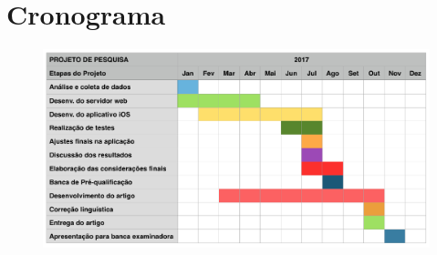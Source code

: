 \documentclass[
	12pt,
	oneside,
	a4paper,
	english,
	brazil,
]{abntex2}
\begin{document}

\chapter{Cronograma}

\begin{figure}[h]
\centering
\includegraphics[width=1.0\textwidth]{cronograma}
\end{figure}


\postextual



%
%
\end{document}
